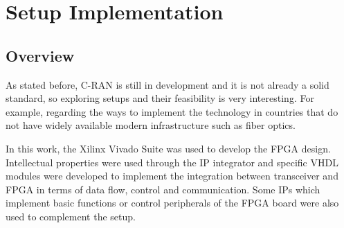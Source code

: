 \chapter{Setup Implementation}
\label{chap:implementation}

\section{Overview}

As stated before, C-RAN is still in development and it is not already a solid
standard, so exploring setups and their feasibility is very interesting. For
example, regarding the ways to implement the technology in countries that do
not have widely available modern infrastructure such as fiber optics.

%
%

In this work, the Xilinx Vivado Suite was used to develop the FPGA design.
Intellectual properties were used through the IP integrator and specific VHDL
modules were developed to implement the integration between transceiver and
FPGA in terms of data flow, control and communication. Some IPs which implement
basic functions or control peripherals of the FPGA board were also used to
complement the setup.

